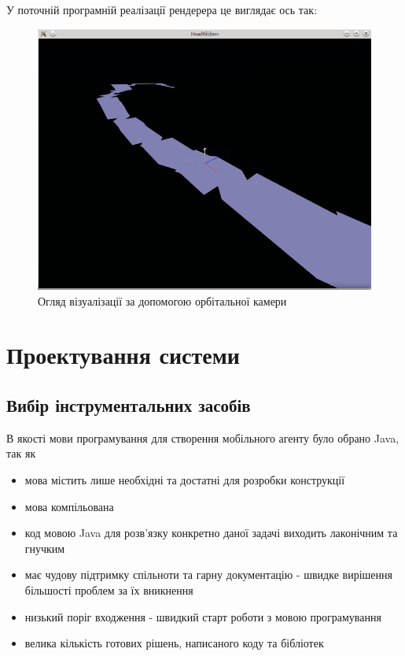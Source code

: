 \documentclass[simple,a4paper,14pt,ukrainian,utf8]{eskdtext}
\begin{document}
    У поточній програмній реалізації рендерера це виглядає ось так:
    
    \vspace{3em}
    \begin{figure}
	    \centering \includegraphics[scale=0.5]{images/camera1.png}
	    \caption{Огляд візуалізації за допомогою орбітальної камери}
	\end{figure}
    
\clearpage \newpage \section{Проектування системи}

    \subsection{Вибір інструментальних засобів}

        В якості мови програмування для створення мобільного агенту було обрано Java, так як

        \begin{itemize}
            \item мова містить лише необхідні та достатні для розробки конструкції
            \item мова компільована
            \item код мовою Java для розв’язку конкретно даної задачі виходить лаконічним та гнучким
            \item має чудову підтримку спільноти та гарну документацію - швидке вирішення більшості проблем за їх вникнення
            \item низький поріг входження - швидкий старт роботи з мовою програмування
            \item велика кількість готових рішень, написаного коду та бібліотек
        \end{itemize}
        
\end{document}
